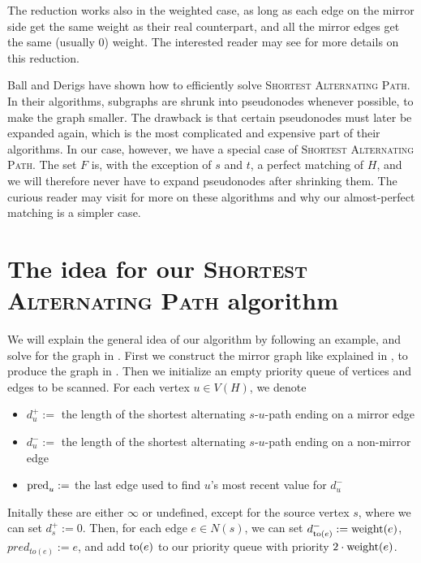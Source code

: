 The reduction works also in the weighted case, as long as each edge on the mirror side get the same weight as their real counterpart, and all the mirror edges get the same (usually 0) weight. The interested reader may see \cite{source:derigs_shortest_odd_path} for more details on this reduction.

Ball and Derigs \cite{source:shortest_alternating_path} have shown how to efficiently solve \textsc{Shortest Alternating Path}. In their algorithms, subgraphs are shrunk into pseudonodes whenever possible, to make the graph smaller. The drawback is that certain pseudonodes must later be expanded again, which is the most complicated and expensive part of their algorithms. In our case, however, we have a special case of \textsc{Shortest Alternating Path}. The set $F$ is, with the exception of $s$ and $t$, a perfect matching of $H$, and we will therefore never have to expand pseudonodes after shrinking them. The curious reader may visit \cite{source:shortest_alternating_path} for more on these algorithms and why our almost-perfect matching is a simpler case.

\section{The idea for our \textsc{Shortest Alternating Path} algorithm}
We will explain the general idea of our algorithm by following an example, and solve for the graph in . First we construct the mirror graph like explained in , to produce the graph in . Then we initialize an empty priority queue of vertices and edges to be scanned. For each vertex $u \in V(H)$, we denote
\begin{itemize}
    \item $d^+_u :=$ the length of the shortest alternating $s$-$u$-path ending on a mirror edge
    \item $d^-_u :=$ the length of the shortest alternating $s$-$u$-path ending on a non-mirror edge
    \item $\operatorname{pred}_u :=$ the last edge used to find $u$'s most recent value for $d^-_u$
\end{itemize}

Initally these are either $\infty$ or undefined, except for the source vertex $s$, where we can set $d^+_s := 0$. Then, for each edge $e \in N(s)$, we can set $d^-_{\operatorname{to}(e)} := \operatorname{weight}(e)$, $pred_{to(e)} := e$, and add $\operatorname{to}(e)$ to our priority queue with priority $2 \cdot \operatorname{weight}(e)$.

